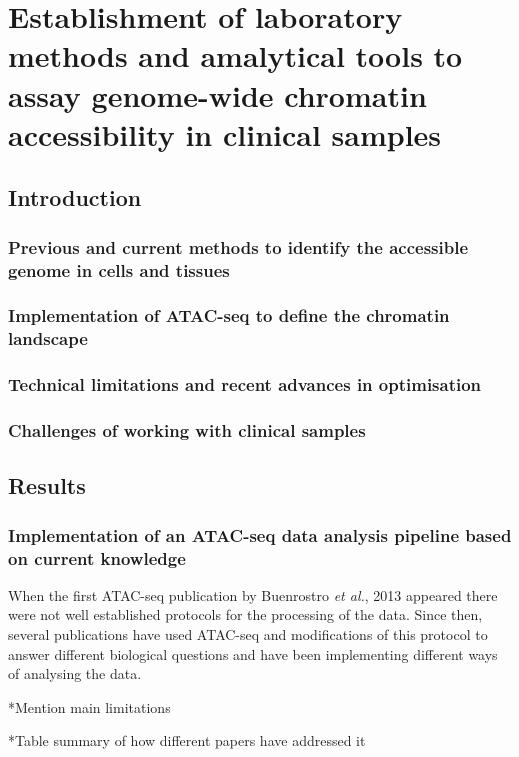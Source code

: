\chapter{Establishment of laboratory methods and amalytical tools to assay genome-wide chromatin accessibility in clinical samples}
\label{ch:Results 1}


\section{Introduction}
\subsection*{Previous and current methods to identify the accessible genome in cells and tissues}
\subsection*{Implementation of ATAC-seq to define the chromatin landscape}
\subsection*{Technical limitations and recent advances in optimisation}
\subsection*{Challenges of working with clinical samples}

\section{Results}
%

\subsection*{Implementation of an ATAC-seq data analysis pipeline based on current knowledge}
When the first ATAC-seq publication by Buenrostro \textit{et al.}, 2013 appeared there were not well established protocols for the processing of the data. Since then, several publications have used ATAC-seq and modifications of this protocol to answer different biological questions and have been implementing different ways of analysing the data. 

*Mention main limitations


*Table summary of how different papers have addressed it



